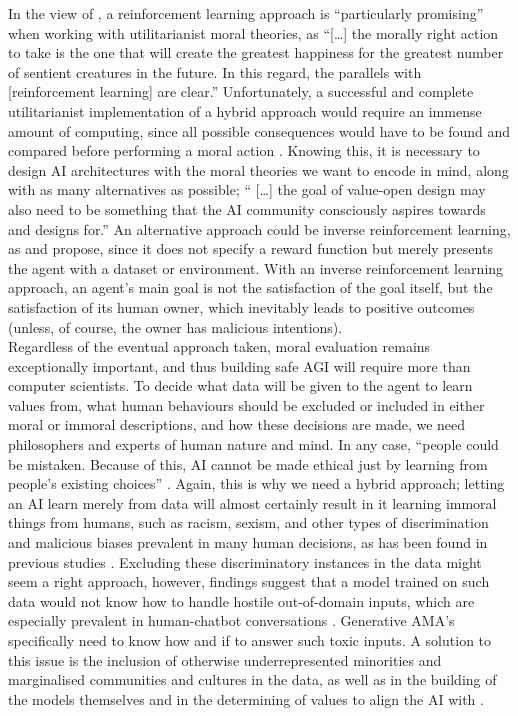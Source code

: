\documentclass[final]{clv3} %
\begin{document}
In the view of \citet[p. 4]{gabriel}, a reinforcement learning approach is “particularly promising” when working with utilitarianist moral theories, as “[…] the morally right action to take is the one that will create the greatest happiness for the greatest number of sentient creatures in the future. In this regard, the parallels with [reinforcement learning] are clear.” Unfortunately, a successful and complete utilitarianist implementation of a hybrid approach would require an immense amount of computing, since all possible consequences would have to be found and compared before performing a moral action \cite{allen2005}. Knowing this, it is necessary to design AI architectures with the moral theories we want to encode in mind, along with as many alternatives as possible; “ […] the goal of value-open design may also need to be something that the AI community consciously aspires towards and designs for.” \cite[p. 5]{gabriel} An alternative approach could be inverse reinforcement learning, as \citet{gabriel} and \citet{tegmark} propose, since it does not specify a reward function but merely presents the agent with a dataset or environment. With an inverse reinforcement learning approach, an agent’s main goal is not the satisfaction of the goal itself, but the satisfaction of its human owner, which inevitably leads to positive outcomes (unless, of course, the owner has malicious intentions). \\

Regardless of the eventual approach taken, moral evaluation remains exceptionally important, and thus building safe AGI will require more than computer scientists. To decide what data will be given to the agent to learn values from, what human behaviours should be excluded or included in either moral or immoral descriptions, and how these decisions are made, we need philosophers and experts of human nature and mind. In any case, “people could be mistaken. Because of this, AI cannot be made ethical just by learning from people’s existing choices” \cite[p. 6]{gabriel}. Again, this is why we need a hybrid approach; letting an AI learn merely from data will almost certainly result in it learning immoral things from humans, such as racism, sexism, and other types of discrimination and malicious biases prevalent in many human decisions, as has been found in previous studies \cite{schramowski, howard}. Excluding these discriminatory instances in the data might seem a right approach, however, findings suggest that a model trained on such data would not know how to handle hostile out-of-domain inputs, which are especially prevalent in human-chatbot conversations \cite{xu}. Generative AMA’s specifically need to know how and if to answer such toxic inputs. A solution to this issue is the inclusion of otherwise underrepresented minorities and marginalised communities and cultures in the data, as well as in the building of the models themselves and in the determining of values to align the AI with \cite{gabriel}.\\
\end{document}
